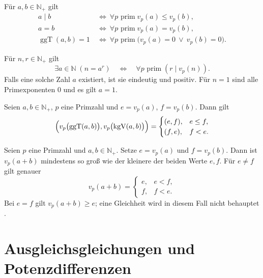 \begin{theorem}
\label{b10guide:thm:prime-exponent-comparison}
Für $a,b\in\mathbb N_+$ gilt
\[
 \begin{aligned}
 a\mid b
 &\ \Longleftrightarrow\ \forall p\text{ prim}\;v_p(a)\le v_p(b),\\
 a=b
 &\ \Longleftrightarrow\ \forall p\text{ prim}\;v_p(a)=v_p(b),\\
 \operatorname{ggT}(a,b)=1
 &\ \Longleftrightarrow\ \forall p\text{ prim}\;
       \bigl(v_p(a)=0\ \lor\ v_p(b)=0\bigr).
 \end{aligned}
\]
\end{theorem}

\begin{theorem}
\label{b10guide:thm:perfect-power-criterion}
Für $n,r\in\mathbb N_+$ gilt
\[
 \exists a\in\mathbb N\;(n=a^r)
 \quad\Longleftrightarrow\quad
 \forall p\text{ prim}\;(r\mid v_p(n)).
\]
Falls eine solche Zahl $a$ existiert, ist sie eindeutig und positiv.
Für $n=1$ sind alle Primexponenten $0$ und es gilt $a=1$.
\end{theorem}
\begin{theorem}
\label{b10guide:thm:prime-exponent-gcd-lcm}
Seien $a,b\in\mathbb N_+$, $p$ eine Primzahl und
$e=v_p(a)$, $f=v_p(b)$. Dann gilt
\[
 \Bigl(v_p\bigl(\operatorname{ggT}(a,b)\bigr),
       v_p\bigl(\operatorname{kgV}(a,b)\bigr)\Bigr)
 =\begin{cases}(e,f),&e\le f,\\(f,e),&f<e.\end{cases}
\]
\end{theorem}

\begin{theorem}
\label{b10guide:thm:prime-exponent-sum}
Seien $p$ eine Primzahl und $a,b\in\mathbb N_+$.
Setze $e=v_p(a)$ und $f=v_p(b)$.
Dann ist $v_p(a+b)$ mindestens so groß wie der kleinere der beiden
Werte $e,f$. Für $e\ne f$ gilt genauer
\[
 v_p(a+b)=\begin{cases}e,&e<f,\\f,&f<e.\end{cases}
\]
Bei $e=f$ gilt $v_p(a+b)\ge e$; eine Gleichheit wird in diesem Fall
nicht behauptet \cite{natvalsum}.
\end{theorem}

\section{Ausgleichsgleichungen und Potenzdifferenzen}

